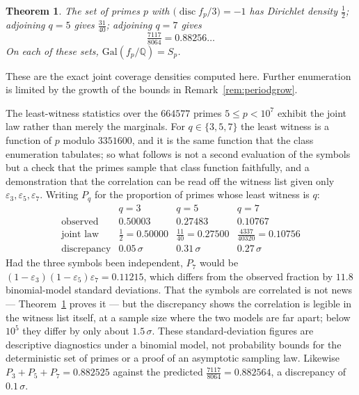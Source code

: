 \documentclass[11pt,a4paper]{amsart}
\newcommand{\Q}{\mathbb{Q}}
\newcommand{\Gal}{\mathrm{Gal}}
\newcommand{\disc}{\operatorname{disc}}
\theoremstyle{plain}
\newtheorem{theorem}{Theorem}
\theoremstyle{definition}
\begin{document}
\begin{theorem}
\label{thm:dens}
The set of primes \(p\) with \(\bigl(\disc f_p/3\bigr)=-1\) has Dirichlet density \(\tfrac12\); adjoining \(q=5\) gives \(\tfrac{31}{40}\); adjoining \(q=7\) gives
\[
\tfrac{7117}{8064}=0.88256\ldots
\]
On each of these sets, \(\Gal(f_p/\Q)=S_p\).
\end{theorem}

These are the exact joint coverage densities computed here. Further enumeration is limited by the growth of the bounds in Remark~\ref{rem:periodgrow}.

The least-witness statistics over the \(664577\) primes \(5\le p<10^7\) exhibit the joint law rather than merely the marginals. For \(q\in\{3,5,7\}\) the least witness is a function of \(p\) modulo \(3351600\), and it is the same function that the class enumeration tabulates; so what follows is not a second evaluation of the symbols but a check that the primes sample that class function faithfully, and a demonstration that the correlation can be read off the witness list given only \(\varepsilon_3,\varepsilon_5,\varepsilon_7\). Writing \(P_q\) for the proportion of primes whose least witness is \(q\):
\[
\begin{array}{r|lll}
 & q=3 & q=5 & q=7\\\hline
\text{observed} & 0.50003 & 0.27483 & 0.10767\\
\text{joint law} & \tfrac12=0.50000 & \tfrac{11}{40}=0.27500 & \tfrac{4337}{40320}=0.10756\\
\text{discrepancy} & 0.05\,\sigma & 0.31\,\sigma & 0.27\,\sigma
\end{array}
\]
Had the three symbols been independent, \(P_7\) would be \((1-\varepsilon_3)(1-\varepsilon_5)\varepsilon_7=0.11215\), which differs from the observed fraction by \(11.8\) binomial-model standard deviations. That the symbols are correlated is not news --- Theorem~\ref{thm:dens} proves it --- but the discrepancy shows the correlation is legible in the witness list itself, at a sample size where the two models are far apart; below \(10^5\) they differ by only about \(1.5\,\sigma\). These standard-deviation figures are descriptive diagnostics under a binomial model, not probability bounds for the deterministic set of primes or a proof of an asymptotic sampling law. Likewise \(P_3+P_5+P_7=0.882525\) against the predicted \(\tfrac{7117}{8064}=0.882564\), a discrepancy of \(0.1\,\sigma\).
\end{document}
